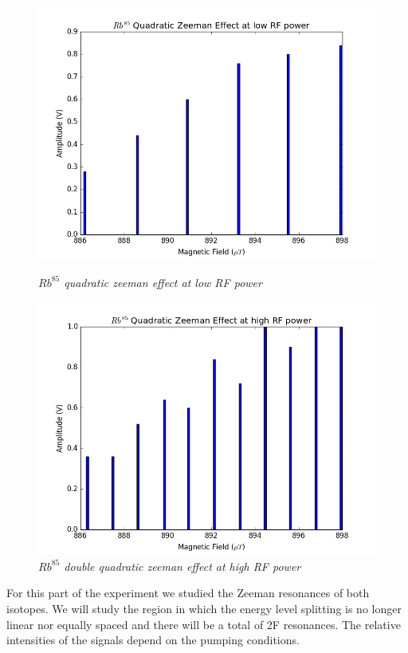 \documentclass[twocolumn]{article}
\begin{document}
\begin{figure}
\begin{minipage}[t]{0.45\linewidth}
\label{fig:25}
\end{minipage}
\vfill
\begin{minipage}[t]{0.45\linewidth}
\includegraphics[width=\linewidth]{pictures/rb85-low.png}
\caption{\textit{$Rb^{85}$ quadratic zeeman effect at low RF power}}
\label{fig:26}
\end{minipage}
\hfill
\begin{minipage}[t]{0.45\linewidth}
\includegraphics[width=\linewidth]{pictures/rb85-high.png}
\caption{\textit{$Rb^{85}$ double quadratic zeeman effect at high RF power}}
\label{fig:27}
\end{minipage}
\end{figure}
For this part of the experiment we studied the Zeeman resonances of both 
isotopes. We will study the region in which the energy level splitting is no 
longer linear nor equally spaced and there will be a total of 2F resonances. 
The relative intensities of the signals depend on the pumping conditions.
\end{document}

